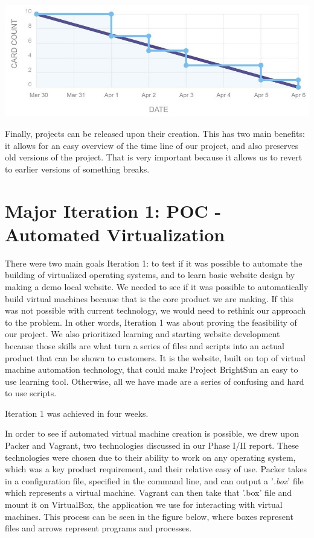 \documentclass[openright]{report}
\begin{document}
\begin{center}
    \includegraphics[scale=0.54]{images/throughput.jpg}
\end{center}

\par Finally, projects can be released upon their creation. This has two main benefits: it allows for an easy overview of the time line of our project, and also preserves old versions of the project. That is very important because it allows us to revert to earlier versions of something breaks.

\section{Major Iteration 1: POC - Automated Virtualization}
\par There were two main goals Iteration 1: to test if it was possible to automate the building of virtualized operating systems, and to learn basic website design by making a demo local website. We needed to see if it was possible to automatically build virtual machines because that is the core product we are making. If this was not possible with current technology, we would need to rethink our approach to the problem. In other words, Iteration 1 was about proving the feasibility of our project. We also prioritized learning and starting website development because those skills are what turn a series of files and scripts into an actual product that can be shown to customers. It is the website, built on top of virtual machine automation technology, that could make Project BrightSun an easy to use learning tool. Otherwise, all we have made are a series of confusing and hard to use scripts. 
\par Iteration 1 was achieved in four weeks.

\par In order to see if automated virtual machine creation is possible, we drew upon Packer and Vagrant, two technologies discussed in our Phase I/II report. These technologies were chosen due to their ability to work on any operating system, which was a key product requirement, and their relative easy of use. Packer takes in a configuration file, specified in the command line, and can output a '\textit{.box}' file which represents a virtual machine. Vagrant can then take that '.box' file and mount it on VirtualBox, the application we use for interacting with virtual machines. This process can be seen in the figure below, where boxes represent files and arrows represent programs and processes.
\end{document}
